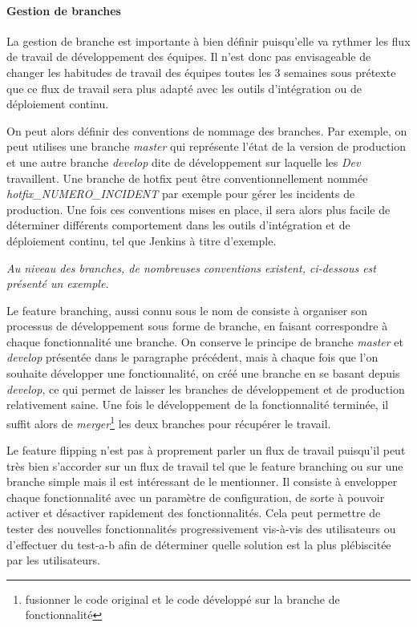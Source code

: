 \paragraph{Gestion de branches}

La gestion de branche est importante à bien définir puisqu'elle va rythmer les flux de travail de développement des équipes. Il n'est donc pas envisageable de changer les habitudes de travail des équipes toutes les 3 semaines sous prétexte que ce flux de travail sera plus adapté avec les outils d'intégration ou de déploiement continu.

On peut alors définir des conventions de nommage des branches. Par exemple, on peut utilises une branche \emph{master} qui représente l'état de la version de production et une autre branche \emph{develop} dite de développement sur laquelle les \emph{Dev} travaillent. Une branche de \gls{hotfix} peut être conventionnellement nommée \emph{hotfix\_NUMERO\_INCIDENT} par exemple pour gérer les incidents de production. Une fois ces conventions mises en place, il sera alors plus facile de déterminer différents comportement dans les outils d'intégration et de déploiement continu, tel que Jenkins à titre d'exemple.

\emph{Au niveau des branches, de nombreuses conventions existent, ci-dessous est présenté un exemple.}

Le feature branching, aussi connu sous le nom de  consiste à organiser son processus de développement sous forme de branche, en faisant correspondre à chaque fonctionnalité une branche. On conserve le principe de branche \emph{master} et \emph{develop} présentée dans le paragraphe précédent, mais à chaque fois que l'on souhaite développer une fonctionnalité, on créé une branche en se basant depuis \emph{develop}, ce qui permet de laisser les branches de développement et de production relativement saine. Une fois le développement de la fonctionnalité terminée, il suffit alors de \emph{merger}\footnote{fusionner le code original et le code développé sur la branche de fonctionnalité} les deux branches pour récupérer le travail.


Le feature flipping n'est pas à proprement parler un flux de travail puisqu'il peut très bien s'accorder sur un flux de travail tel que le feature branching ou sur une branche simple mais il est intéressant de le mentionner. Il consiste à envelopper chaque fonctionnalité avec un paramètre de configuration, de sorte à pouvoir activer et désactiver rapidement des fonctionnalités. Cela peut permettre de tester des nouvelles fonctionnalités progressivement vis-à-vis des utilisateurs ou d'effectuer du \gls{test-a-b} afin de déterminer quelle solution est la plus plébiscitée par les utilisateurs. 

